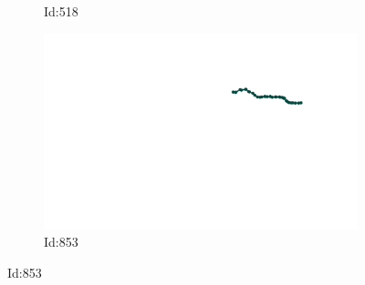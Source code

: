 \documentclass[12pt,twoside]{report}
\begin{document}
\begin{figure}
\begin{subfigure}[b]{0.20\textwidth}
\caption{Id:518}
\end{subfigure}
\begin{subfigure}[b]{0.20\textwidth}
\centering
\includegraphics[width=\textwidth]{../../trajectories/853.png}
\caption{Id:853}
\end{subfigure}
\end{figure}
\end{document}
